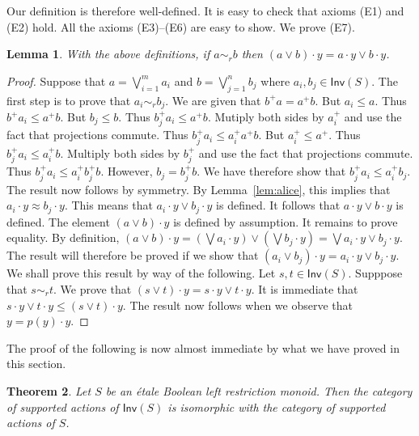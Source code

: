 \documentclass[a4paper]{amsart}
\newtheorem{theorem}{Theorem}[section]
\newtheorem{lemma}[theorem]{Lemma}
\begin{document}
Our definition is therefore well-defined.
It is easy to check that axioms (E1) and (E2) hold.
All the axioms (E3)--(E6) are easy to show.
We prove (E7).

\begin{lemma} With the above definitions, if $a \sim_{r} b$ then $(a \vee b) \cdot y = a \cdot y \vee b \cdot y$.
\end{lemma}
\begin{proof} Suppose that $a = \bigvee_{i=1}^{m} a_{i}$ and $b = \bigvee_{j=1}^{n} b_{j}$ where
$a_{i}, b_{j} \in \mathsf{Inv}(S)$.
The first step is to prove  that $a_{i} \sim_{r} b_{j}$.
We are given that $b^{+}a = a^{+}b$.
But $a_{i} \leq a$.
Thus $b^{+}a_{i} \leq a^{+}b$.
But $b_{j} \leq b$.
Thus $b_{j}^{+}a_{i} \leq a^{+}b$.
Mutiply both sides by $a_{i}^{+}$ and use the fact that projections commute.
Thus $b_{j}^{+}a_{i} \leq a_{i}^{+}a^{+}b$.
But $a_{i}^{+} \leq a^{+}$.
Thus $b_{j}^{+}a_{i} \leq a_{i}^{+}b$.	 
Multiply both sides by $b_{j}^{+}$
and use the fact that projections commute.
Thus $b_{j}^{+}a_{i} \leq a_{i}^{+}b_{j}^{+}b$.	 
However, $b_{j} = b_{j}^{+}b$.
We have therefore show that 
$b_{j}^{+}a_{i} \leq a_{i}^{+}b_{j}$.	
The result now follows by symmetry. 
By Lemma~\ref{lem:alice}, this implies that $a_{i} \cdot y \approx b_{j} \cdot y$.
This means that $a_{i} \cdot y \vee b_{j} \cdot y$ is defined.
It follows that $a \cdot y \vee b \cdot y$ is defined.
The element $(a \vee b) \cdot y$ is defined by assumption.
It remains to prove equality.
By definition, $(a \vee b) \cdot y = \left( \bigvee  a_{i} \cdot y \right) \vee \left( \bigvee b_{j} \cdot y \right) = \bigvee a_{i} \cdot y \vee b_{j} \cdot y$.
The result will therefore be proved if we show that $(a_{i} \vee b_{j}) \cdot y = a_{i} \cdot y \vee b_{j} \cdot y$.
We shall prove this result by way of the following.
Let $s,t \in \mathsf{Inv}(S)$.
Supppose that $s \sim_{r} t$.
We prove that $(s \vee t) \cdot y = s \cdot y \vee t \cdot y$.
It is immediate that $s \cdot y \vee t \cdot y \leq (s \vee t) \cdot y$.
The result now follows when we observe that $y = p(y) \cdot y$.
\end{proof}


The proof of the following is now almost immediate by what we have proved in this section.

\begin{theorem} Let $S$ be an \'etale Boolean left restriction monoid.
Then the category of supported actions of $\mathsf{Inv}(S)$ is isomorphic
with the category of supported actions of $S$.
\end{theorem}
\end{document}

